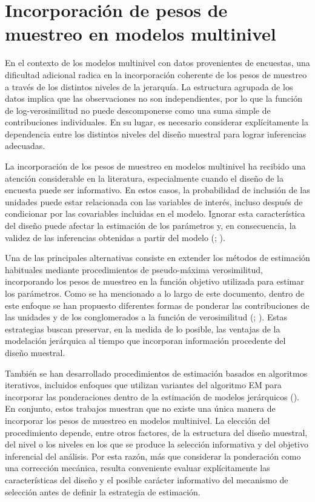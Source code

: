 \documentclass[
  spanish,
  11pt,
  letterpaper,
  oneside,
  open=any]{scrbook}
\begin{document}
\section{Incorporación de pesos de muestreo en modelos
multinivel}\label{pesos-q-weighted}

En el contexto de los modelos multinivel con datos provenientes de
encuestas, una dificultad adicional radica en la incorporación coherente
de los pesos de muestreo a través de los distintos niveles de la
jerarquía. La estructura agrupada de los datos implica que las
observaciones no son independientes, por lo que la función de
log-verosimilitud no puede descomponerse como una suma simple de
contribuciones individuales. En su lugar, es necesario considerar
explícitamente la dependencia entre los distintos niveles del diseño
muestral para lograr inferencias adecuadas.

La incorporación de los pesos de muestreo en modelos multinivel ha
recibido una atención considerable en la literatura, especialmente
cuando el diseño de la encuesta puede ser informativo. En estos casos,
la probabilidad de inclusión de las unidades puede estar relacionada con
las variables de interés, incluso después de condicionar por las
covariables incluidas en el modelo. Ignorar esta característica del
diseño puede afectar la estimación de los parámetros y, en consecuencia,
la validez de las inferencias obtenidas a partir del modelo
(;
).

Una de las principales alternativas consiste en extender los métodos de
estimación habituales mediante procedimientos de pseudo-máxima
verosimilitud, incorporando los pesos de muestreo en la función objetivo
utilizada para estimar los parámetros. Como se ha mencionado a lo largo
de este documento, dentro de este enfoque se han propuesto diferentes
formas de ponderar las contribuciones de las unidades y de los
conglomerados a la función de verosimilitud
(;
). Estas estrategias buscan
preservar, en la medida de lo posible, las ventajas de la modelación
jerárquica al tiempo que incorporan información procedente del diseño
muestral.

También se han desarrollado procedimientos de estimación basados en
algoritmos iterativos, incluidos enfoques que utilizan variantes del
algoritmo EM para incorporar las ponderaciones dentro de la estimación
de modelos jerárquicos ().
En conjunto, estos trabajos muestran que no existe una única manera de
incorporar los pesos de muestreo en modelos multinivel. La elección del
procedimiento depende, entre otros factores, de la estructura del diseño
muestral, del nivel o los niveles en los que se produce la selección
informativa y del objetivo inferencial del análisis. Por esta razón, más
que considerar la ponderación como una corrección mecánica, resulta
conveniente evaluar explícitamente las características del diseño y el
posible carácter informativo del mecanismo de selección antes de definir
la estrategia de estimación.
\end{document}
